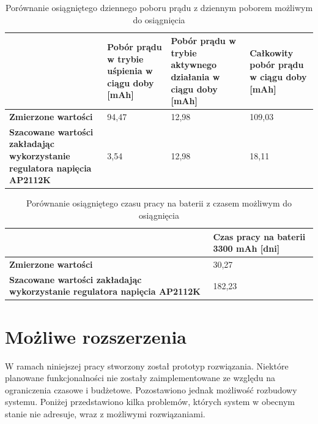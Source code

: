        \begin{table}[]
            \centering
            \caption{Porównanie osiągniętego dziennego poboru prądu z dziennym poborem możliwym do osiągnięcia}
            \begin{tabular}{p{4cm}|p{3cm}|p{3cm}|p{3cm} }
                    & \textbf{Pobór prądu w trybie uśpienia w ciągu doby [mAh]} & \textbf{Pobór prądu w trybie aktywnego działania w ciągu doby [mAh]} & \textbf{Całkowity pobór prądu w ciągu doby [mAh]} \\ \hline
             \textbf{Zmierzone wartości}
                      & 94,47 & 12,98 & 109,03 \\
            \hline
            \textbf{Szacowane wartości zakładając wykorzystanie regulatora napięcia AP2112K} &  3,54 & 12,98 & 18,11 \\
            \end{tabular}
            \label{tbl:tab2}
            \vspace{10mm}
        \end{table}

        \begin{table}[]
            \caption{Porównanie osiągniętego czasu pracy na baterii z czasem możliwym do osiągnięcia}
            \centering
            \begin{tabular}{p{}|p{}}
                    & \textbf{Czas pracy na baterii 3300 mAh [dni]} \\ \hline
             \textbf{Zmierzone wartości}
                      & 30,27 \\
            \hline
            \textbf{Szacowane wartości zakładając wykorzystanie regulatora napięcia AP2112K} &  182,23  \\
            \end{tabular}
            \label{tbl:tab3}
            \vspace{10mm}
        \end{table}

	\section{Możliwe rozszerzenia}

        W ramach niniejszej pracy stworzony został prototyp rozwiązania. Niektóre planowane funkcjonalności nie zostały zaimplementowane ze względu na ograniczenia czasowe i budżetowe. Pozostawiono jednak możliwość rozbudowy systemu. Poniżej przedstawiono kilka problemów, których system w obecnym stanie nie adresuje, wraz z możliwymi rozwiązaniami.

